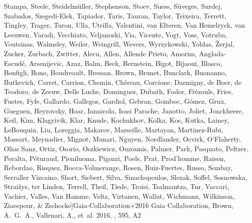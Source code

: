 \documentclass{aa}
\begin{document}
\begin{thebibliography}{242}
{  {Stampa}, {Steele}, {Steidelm{\"u}ller}, {Stephenson}, {Stoev}, {Suess},
  {S{\"u}veges}, {Surdej}, {Szabados}, {Szegedi-Elek}, {Tapiador}, {Taris},
  {Tauran}, {Taylor}, {Teixeira}, {Terrett}, {Tingley}, {Trager}, {Turon},
  {Ulla}, {Utrilla}, {Valentini}, {van Elteren}, {Van Hemelryck}, {van
  Leeuwen}, {Varadi}, {Vecchiato}, {Veljanoski}, {Via}, {Vicente}, {Vogt},
  {Voss}, {Votruba}, {Voutsinas}, {Walmsley}, {Weiler}, {Weingrill}, {Wevers},
  {Wyrzykowski}, {Yoldas}, {{\v Z}erjal}, {Zucker}, {Zurbach}, {Zwitter},
  {Alecu}, {Allen}, {Allende Prieto}, {Amorim}, {Anglada-Escud{\'e}},
  {Arsenijevic}, {Azaz}, {Balm}, {Beck}, {Bernstein}, {Bigot}, {Bijaoui},
  {Blasco}, {Bonfigli}, {Bono}, {Boudreault}, {Bressan}, {Brown}, {Brunet},
  {Bunclark}, {Buonanno}, {Butkevich}, {Carret}, {Carrion}, {Chemin},
  {Ch{\'e}reau}, {Corcione}, {Darmigny}, {de Boer}, {de Teodoro}, {de Zeeuw},
  {Delle Luche}, {Domingues}, {Dubath}, {Fodor}, {Fr{\'e}zouls}, {Fries},
  {Fustes}, {Fyfe}, {Gallardo}, {Gallegos}, {Gardiol}, {Gebran}, {Gomboc},
  {G{\'o}mez}, {Grux}, {Gueguen}, {Heyrovsky}, {Hoar}, {Iannicola}, {Isasi
  Parache}, {Janotto}, {Joliet}, {Jonckheere}, {Keil}, {Kim}, {Klagyivik},
  {Klar}, {Knude}, {Kochukhov}, {Kolka}, {Kos}, {Kutka}, {Lainey}, {LeBouquin},
  {Liu}, {Loreggia}, {Makarov}, {Marseille}, {Martayan}, {Martinez-Rubi},
  {Massart}, {Meynadier}, {Mignot}, {Munari}, {Nguyen}, {Nordlander}, {Ocvirk},
  {O'Flaherty}, {Olias Sanz}, {Ortiz}, {Osorio}, {Oszkiewicz}, {Ouzounis},
  {Palmer}, {Park}, {Pasquato}, {Peltzer}, {Peralta}, {P{\'e}turaud},
  {Pieniluoma}, {Pigozzi}, {Poels}, {Prat}, {Prod'homme}, {Raison}, {Rebordao},
  {Risquez}, {Rocca-Volmerange}, {Rosen}, {Ruiz-Fuertes}, {Russo}, {Sembay},
  {Serraller Vizcaino}, {Short}, {Siebert}, {Silva}, {Sinachopoulos}, {Slezak},
  {Soffel}, {Sosnowska}, {Strai{\v z}ys}, {ter Linden}, {Terrell}, {Theil},
  {Tiede}, {Troisi}, {Tsalmantza}, {Tur}, {Vaccari}, {Vachier}, {Valles}, {Van
  Hamme}, {Veltz}, {Virtanen}, {Wallut}, {Wichmann}, {Wilkinson}, {Ziaeepour},
  \& {Zschocke}}]{Gaia-Collaboration+2016}
{Gaia Collaboration}, {Brown}, A.~G.~A., {Vallenari}, A., {et~al.}
  2016{}, \aap, 595, A2


\end{thebibliography}
\end{document}
